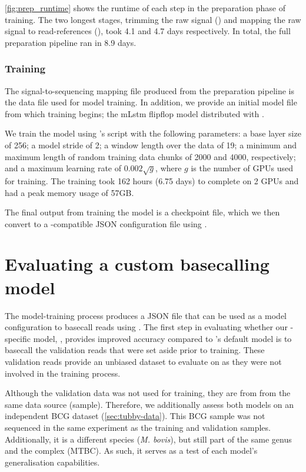 \autoref{fig:prep_runtime} shows the runtime of each step in the preparation phase of training. The two longest stages, trimming the raw signal () and mapping the raw signal to read-references (), took 4.1 and 4.7 days respectively. In total, the full preparation pipeline ran in 8.9 days. 

\subsubsection{Training}

The signal-to-sequencing mapping file produced from the preparation pipeline is the data file used for model training. In addition, we provide an initial model file from which training begins; the mLstm flipflop model distributed with \taiyaki{}.

We train the model using \taiyaki{}'s  script with the following parameters: a base layer size of 256; a model stride of 2; a window length over the data of 19; a minimum and maximum length of random training data chunks of 2000 and 4000, respectively; and a maximum learning rate of $0.002\sqrt{g}$, where $g$ is the number of GPUs used for training. The training took 162 hours (6.75 days) to complete on 2 GPUs and had a peak memory usage of 57GB. 

The final output from training the model is a checkpoint file, which we then convert to a \guppy{}-compatible JSON configuration file using \taiyaki{}.

\section{Evaluating a custom \ont{} basecalling model}

The model-training process produces a JSON file that can be used as a model configuration to basecall \ont{} reads using \guppy{}. The first step in evaluating whether our \mtb{}-specific model, \tubby{}, provides improved accuracy compared to \guppy{}'s default model is to basecall the validation reads that were set aside prior to training. These validation reads provide an unbiased dataset to evaluate on as they were not involved in the training process. 

Although the validation data was not used for training, they are from from the same data source (sample). Therefore, we additionally assess both models on an independent BCG dataset (\autoref{sec:tubby-data}). This BCG sample was not sequenced in the same experiment as the training and validation samples. Additionally, it is a different species (\textit{M. bovis}), but still part of the same genus and the \mtb{} complex (MTBC). As such, it serves as a test of each model's generalisation capabilities. 

